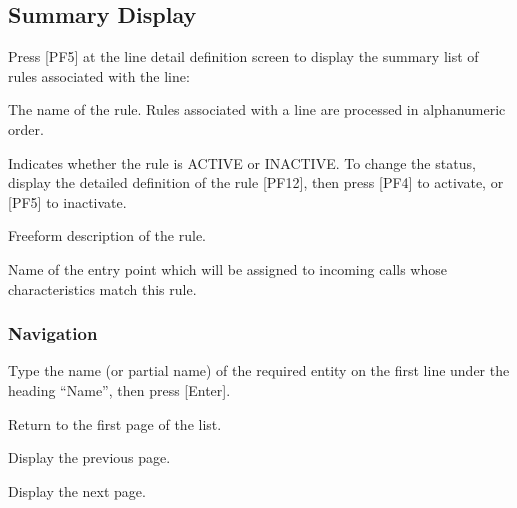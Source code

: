 \documentclass[letterpaper,10pt,english]{sphinxmanual}
\begin{document}
\ignorespaces 

\subsection{Summary Display}
\label{\detokenize{connectivity_guide:index-94}}\label{\detokenize{connectivity_guide:id46}}
\sphinxAtStartPar
Press {[}PF5{]} at the line detail definition screen to display the summary list of rules associated with the line:

\sphinxAtStartPar
{}

\sphinxAtStartPar
{}
\begin{description}
\sphinxAtStartPar
The name of the rule. Rules associated with a line are processed in alphanumeric order.

\sphinxAtStartPar
Indicates whether the rule is ACTIVE or INACTIVE. To change the status, display the detailed definition of the rule {[}PF12{]}, then press {[}PF4{]} to activate, or {[}PF5{]} to inactivate.

\sphinxAtStartPar
Free\sphinxhyphen{}form description of the rule.

\sphinxAtStartPar
Name of the entry point which will be assigned to incoming calls whose characteristics match this rule.

\end{description}


\subsubsection{Navigation}
\label{\detokenize{connectivity_guide:id47}}\begin{description}
\sphinxAtStartPar
Type the name (or partial name) of the required entity on the first line under the heading “Name”, then press {[}Enter{]}.

\sphinxlineitem{{[}PF6{]}}
\sphinxAtStartPar
Return to the first page of the list.

\sphinxlineitem{{[}PF7{]}}
\sphinxAtStartPar
Display the previous page.

\sphinxlineitem{{[}PF8{]}}
\sphinxAtStartPar
Display the next page.

\end{description}
\end{document}
